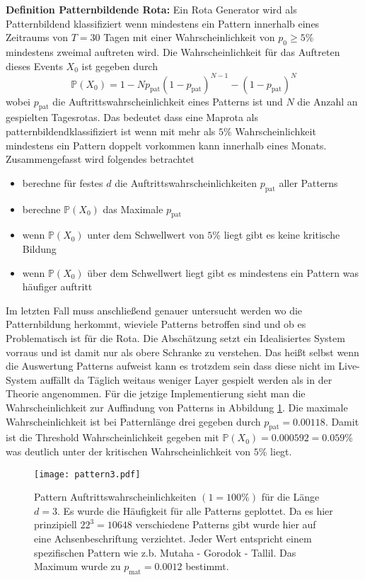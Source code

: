         \textbf{Definition Patternbildende Rota:}
        Ein Rota Generator wird als \glqq Patternbildend \grqq klassifiziert wenn mindestens ein Pattern innerhalb eines Zeitraums 
        von $T = 30$ Tagen mit einer Wahrscheinlichkeit von $p_0 \geq 5$\% mindestens zweimal auftreten wird. 
        Die Wahrscheinlichkeit für das Auftreten dieses Events $ X_0 $ ist gegeben durch
        \begin{equation}
            \mathbb{P}(X_0) = 1-N p_\text{pat}(1-p_\text{pat})^{N-1}-(1-p_\text{pat})^N
        \end{equation}
        wobei $p_\text{pat}$ die Auftrittswahrscheinlichkeit eines Patterns ist und $N$ die Anzahl an
        gespielten Tagesrotas. Das bedeutet dass eine Maprota als \glqq patternbildend\grqq klassifiziert
        ist wenn mit mehr als $5$\% Wahrscheinlichkeit mindestens ein Pattern doppelt vorkommen
        kann innerhalb eines Monats.
        Zusammengefasst wird folgendes betrachtet 
        \begin{itemize}
            \item berechne für festes $d$ die Auftrittswahrscheinlichkeiten $p_\text{pat}$ aller Patterns
            \item berechne $\mathbb{P}(X_0)$ das Maximale $p_\text{pat}$ 
            \item wenn $\mathbb{P}(X_0)$ unter dem Schwellwert von $5$\% liegt gibt es keine kritische Bildung
            \item wenn $\mathbb{P}(X_0)$ über dem Schwellwert liegt gibt es mindestens ein Pattern was häufiger auftritt
        \end{itemize}
        Im letzten Fall muss anschließend genauer untersucht werden wo die Patternbildung herkommt, wieviele Patterns betroffen sind und ob es Problematisch ist für die Rota. 
        Die Abschätzung setzt ein Idealisiertes System vorraus und ist damit nur als obere Schranke zu verstehen. 
        Das heißt selbst wenn die Auswertung Patterns aufweist kann es trotzdem sein dass diese nicht im Live-System auffällt da Täglich weitaus weniger Layer gespielt werden als in der Theorie angenommen.
        Für die jetzige Implementierung sieht man die Wahrscheinlichkeit zur Auffindung von Patterns in Abbildung \ref{fig:pattern}. 
        Die maximale Wahrscheinlichkeit ist bei Patternlänge drei gegeben durch $p_\text{pat}=0.00118$. 
        Damit ist die Threshold Wahrscheinlichkeit gegeben mit $\mathbb{P}(X_0) = 0.000592=0.059$\% was deutlich unter der kritischen Wahrscheinlichkeit von $5$\% liegt.
        \begin{figure}
            \centering
            \texttt{[image: pattern3.pdf]}
            \caption{Pattern Auftrittswahrscheinlichkeiten $(1=100\%)$ für die Länge $d=3$. 
            Es wurde die Häufigkeit für alle Patterns geplottet. 
            Da es hier prinzipiell $22^3=10648$ verschiedene Patterns gibt wurde hier auf eine Achsenbeschriftung verzichtet. 
            Jeder Wert entspricht einem spezifischen Pattern wie z.b. \glqq Mutaha - Gorodok - Tallil\grqq.
            Das Maximum wurde zu $p_\text{mat}=0.0012$ bestimmt.}
            \label{fig:pattern}
        \end{figure}
